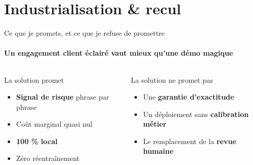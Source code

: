 \section{Industrialisation \& recul}

\begin{frame}{Ce que je promets, et ce que je refuse de promettre}
  \framesubtitle{Un engagement client éclairé vaut mieux qu'une démo magique}
  \begin{columns}[T,onlytextwidth]
      \begin{exampleblock}{La solution promet}
        \small
        \begin{itemize}
          \item \textbf{Signal de risque} phrase par phrase
          \item Coût marginal quasi nul
          \item \textbf{100 \% local}
          \item Zéro réentraînement
        \end{itemize}
      \end{exampleblock}
      \begin{alertblock}{La solution ne promet pas}
        \small
        \begin{itemize}
          \item Une \textbf{garantie d'exactitude}
          \item Un déploiement sans \textbf{calibration métier}
          \item Le remplacement de la \textbf{revue humaine}
        \end{itemize}
      \end{alertblock}
  \end{columns}
  \vspace{0.35cm}
  \centering
  \begin{minipage}{0.84\textwidth}
  \end{minipage}
\end{frame}

